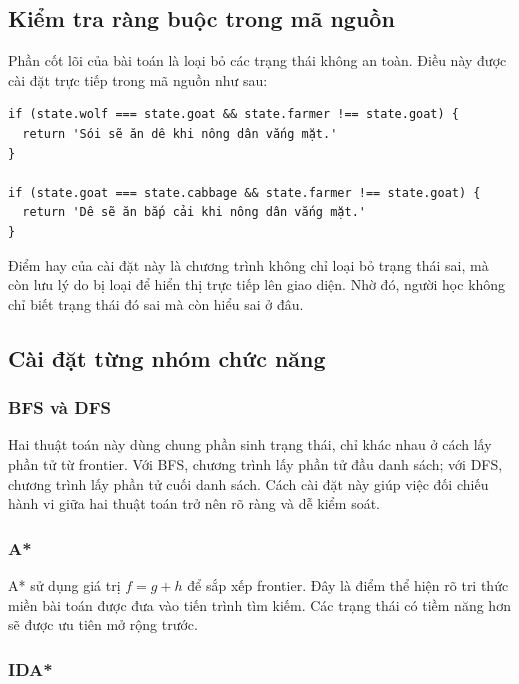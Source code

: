 \documentclass[a4paper,12pt]{article}
\begin{document}
\subsection{Kiểm tra ràng buộc trong mã nguồn}

Phần cốt lõi của bài toán là loại bỏ các trạng thái không an toàn. Điều này được cài đặt trực tiếp trong mã nguồn như sau:

\begin{lstlisting}[caption={Kiểm tra ràng buộc của bài toán}]
if (state.wolf === state.goat && state.farmer !== state.goat) {
  return 'Sói sẽ ăn dê khi nông dân vắng mặt.'
}

if (state.goat === state.cabbage && state.farmer !== state.goat) {
  return 'Dê sẽ ăn bắp cải khi nông dân vắng mặt.'
}
\end{lstlisting}

Điểm hay của cài đặt này là chương trình không chỉ loại bỏ trạng thái sai, mà còn lưu lý do bị loại để hiển thị trực tiếp lên giao diện. Nhờ đó, người học không chỉ biết trạng thái đó sai mà còn hiểu sai ở đâu.

\subsection{Cài đặt từng nhóm chức năng}

\subsubsection{BFS và DFS}

Hai thuật toán này dùng chung phần sinh trạng thái, chỉ khác nhau ở cách lấy phần tử từ frontier. Với BFS, chương trình lấy phần tử đầu danh sách; với DFS, chương trình lấy phần tử cuối danh sách. Cách cài đặt này giúp việc đối chiếu hành vi giữa hai thuật toán trở nên rõ ràng và dễ kiểm soát.

\subsubsection{A*}

A* sử dụng giá trị \(f = g + h\) để sắp xếp frontier. Đây là điểm thể hiện rõ tri thức miền bài toán được đưa vào tiến trình tìm kiếm. Các trạng thái có tiềm năng hơn sẽ được ưu tiên mở rộng trước.

\subsubsection{IDA*}
\end{document}
